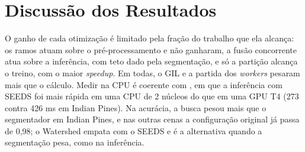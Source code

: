 \section{Discussão dos Resultados}
\label{sec:resDiscussao}

O ganho de cada otimização é limitado pela fração do trabalho que ela alcança: os ramos atuam sobre o pré-processamento e não ganharam, a fusão concorrente atua sobre a inferência, com teto dado pela segmentação, e só a partição alcança o treino, com o maior \textit{speedup}. Em todas, o GIL e a partida dos \textit{workers} pesaram mais que o cálculo. Medir na CPU é coerente com , em que a inferência com SEEDS foi mais rápida em uma CPU de 2 núcleos do que em uma GPU T4 (273 contra 426 ms em Indian Pines). Na acurácia, a busca pesou mais que o segmentador em Indian Pines, e nas outras cenas a configuração original já passa de 0,98; o Watershed empata com o SEEDS e é a alternativa quando a segmentação pesa, como na inferência.
